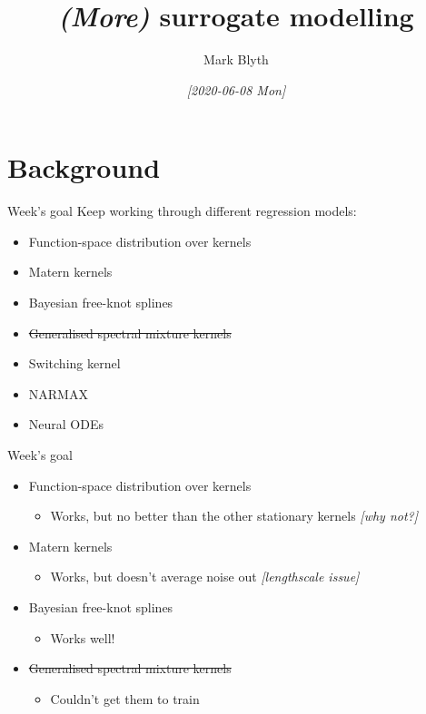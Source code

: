 \documentclass[presentation]{beamer}
\author{Mark Blyth}
\date{\textit{[2020-06-08 Mon]}}
\title{\emph{(More)} surrogate modelling}
\begin{document}
\maketitle

\section{Background}
\label{sec:org3a4ab46}
\begin{frame}[label={sec:org5842576}]{Week's goal}
Keep working through different regression models:
\vfill
\begin{itemize}
\item \alert{Function-space distribution over kernels}
\item \alert{Matern kernels}
\item \alert{Bayesian free-knot splines}
\item \sout{Generalised spectral mixture kernels}
\item Switching kernel
\item NARMAX
\item Neural ODEs
\end{itemize}
\end{frame}

\begin{frame}[label={sec:orga71ed93}]{Week's goal}
\begin{itemize}
\item \alert{Function-space distribution over kernels}
\begin{itemize}
\item Works, but no better than the other stationary kernels \emph{[why not?]}
\end{itemize}
\item \alert{Matern kernels}
\begin{itemize}
\item Works, but doesn't average noise out \emph{[lengthscale issue]}
\end{itemize}
\item \alert{Bayesian free-knot splines}
\begin{itemize}
\item Works well!
\end{itemize}
\item \sout{Generalised spectral mixture kernels}
\begin{itemize}
\item Couldn't get them to train
\end{itemize}
\end{itemize}
\end{frame}
\end{document}
